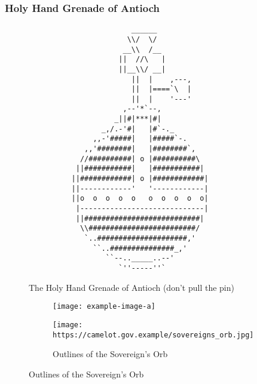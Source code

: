 \documentclass{metanorma}
\begin{document}


\label{holy_hand_grenade}
\subsubsection{Holy Hand Grenade of Antioch}



\begin{figure}[h]\centering
\label{hand-grenade-figure}
\caption{The Holy Hand Grenade of Antioch (don't pull the pin)}
\begin{verbatim}
                        ______
                       \\/  \/
                      __\\  /__
                     ||  //\   |
                     ||__\\/ __|
                        ||  |    ,---,
                        ||  |====`\  |
                        ||  |    '---'
                      ,--'*`--,
                    _||#|***|#|
                 _,/.-'#|   |#`-._
               ,,-'#####|   |#####`-.
             ,,'########|   |########`,
            //##########| o |##########\
           ||###########|   |###########|
          ||############| o |############|
          ||------------'   '------------|
          ||o  o  o  o  o   o  o  o  o  o|
           |-----------------------------|
           ||###########################|
            \\#########################/
             `..#####################,'
               ``..###############_,'
                  ``--.._____..--'
                     `''-----''`
\end{verbatim}
\end{figure}




\begin{figure}[h]\centering
\label{sovereign-orb}
\caption{The Sovereign's Orb made invisible}

  \begin{subfigure}[b]{0.4\textwidth}
    \texttt{[image: example-image-a]}
    \caption{Outlines of the Sovereign's Orb}
    \texttt{[image: https://camelot.gov.example/sovereigns\_orb.jpg]}
  \end{subfigure}
\end{figure}
\end{document}

